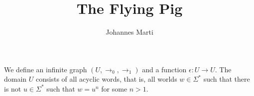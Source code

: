 \documentclass[a4paper]{article}
\title{The Flying Pig}
\author{Johannes Marti}
\begin{document}
\maketitle

We define an infinite graph $(U,\rightarrow_0,\rightarrow_1)$ and a
function $\epsilon : U \to U$. The domain $U$ consists of all acyclic
words, that is, all worlds $w \in \Sigma^*$ such that there is not $u
\in \Sigma^*$ such that $w = u^n$ for some $n > 1$.
\end{document}
